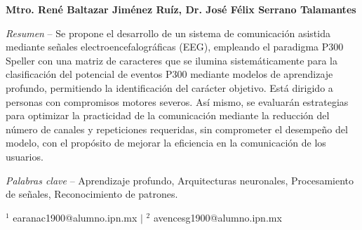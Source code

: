 \begin{titlepage}
\begin{center}
    \vspace{0.3cm}
    \textbf{Mtro. René Baltazar Jiménez Ruíz, Dr. José Félix Serrano Talamantes}
\end{center}

\vspace{1cm}
\small
\noindent\textit{Resumen} -- Se propone el desarrollo de un sistema de comunicación asistida
mediante señales electroencefalográficas (EEG), empleando el paradigma P300 Speller con una
matriz de caracteres que se ilumina sistemáticamente para la clasificación del potencial de
eventos P300 mediante modelos de aprendizaje profundo, permitiendo la identificación del
carácter objetivo. Está dirigido a personas con compromisos motores severos. Así mismo, se
evaluarán estrategias para optimizar la practicidad de la comunicación mediante la reducción
del número de canales y repeticiones requeridas, sin comprometer el desempeño del modelo, con
el propósito de mejorar la eficiencia en la comunicación de los usuarios.

\vspace{0.3cm}
\noindent\textit{Palabras clave} -- Aprendizaje profundo, Arquitecturas neuronales,
Procesamiento de señales, Reconocimiento de patrones.
\normalsize

\vfill
{\footnotesize\centering
$^{1}$ earanac1900@alumno.ipn.mx $\mid$ $^{2}$ avencesg1900@alumno.ipn.mx
\par}
\end{titlepage}
